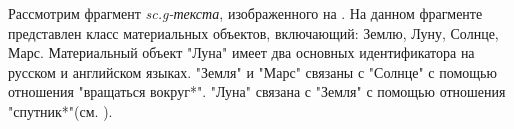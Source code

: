 Рассмотрим фрагмент \textit{sc.g-текста}, изображенного на \textit{}.
На данном фрагменте представлен класс материальных объектов, включающий: Землю, Луну, Солнце, Марс. Материальный объект "Луна" имеет два основных идентификатора на русском и английском языках. "Земля" и "Марс" связаны с "Солнце" с помощью отношения "вращаться вокруг*". "Луна" связана с "Земля" с помощью отношения "спутник*"(см. ).

